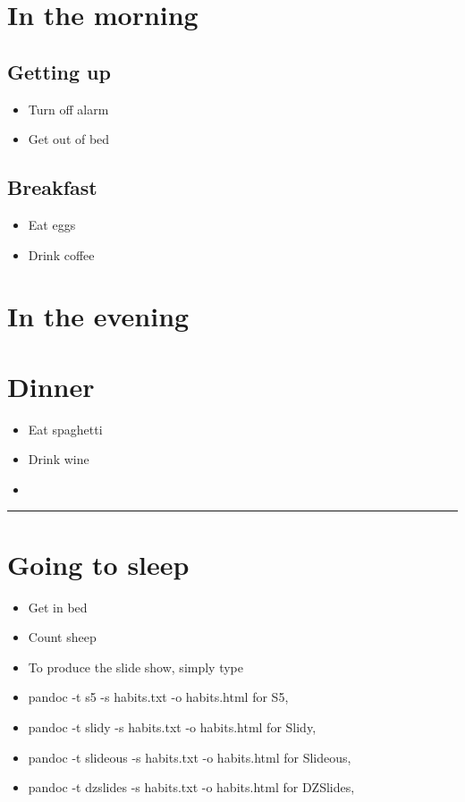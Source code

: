 \section{In the morning}\label{in-the-morning}

\subsection{Getting up}\label{getting-up}

\begin{itemize}
\itemsep1pt\parskip0pt
\item
  Turn off alarm
\item
  Get out of bed
\end{itemize}

\subsection{Breakfast}\label{breakfast}

\begin{itemize}
\itemsep1pt\parskip0pt
\item
  Eat eggs
\item
  Drink coffee
\end{itemize}

\section{In the evening}\label{in-the-evening}

\section{Dinner}\label{dinner}

\begin{itemize}
\item
  Eat spaghetti
\item
  Drink wine
\item
\end{itemize}

\begin{center}\rule{3in}{0.4pt}\end{center}

\section{Going to sleep}\label{going-to-sleep}

\begin{itemize}
\item
  Get in bed
\item
  Count sheep
\item
  To produce the slide show, simply type
\item
  pandoc -t s5 -s habits.txt -o habits.html for S5,
\item
  pandoc -t slidy -s habits.txt -o habits.html for Slidy,
\item
  pandoc -t slideous -s habits.txt -o habits.html for Slideous,
\item
  pandoc -t dzslides -s habits.txt -o habits.html for DZSlides,
\end{itemize}

